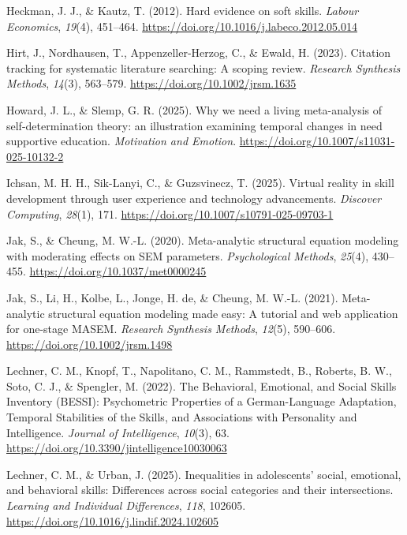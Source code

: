 \documentclass[
  man,
  longtable,
  nolmodern,
  notxfonts,
  notimes,
  colorlinks=true,linkcolor=blue,citecolor=blue,urlcolor=blue]{apa7}
\newlength{\cslhangindent}
\newenvironment{CSLReferences}[2] %
 {\begin{list}{}{%
  \setlength{\itemindent}{0pt}
  \setlength{\leftmargin}{0pt}
  \setlength{\parsep}{0pt}
  \ifodd #1
   \setlength{\leftmargin}{\cslhangindent}
   \setlength{\itemindent}{-1\cslhangindent}
  \fi
  \setlength{\itemsep}{#2\baselineskip}}}
 {\end{list}}
\begin{document}
\begin{CSLReferences}{1}{0}
Heckman, J. J., \& Kautz, T. (2012). Hard evidence on soft skills.
\emph{Labour Economics}, \emph{19}(4), 451--464.
\url{https://doi.org/10.1016/j.labeco.2012.05.014}

Hirt, J., Nordhausen, T., Appenzeller‐Herzog, C., \& Ewald, H. (2023).
Citation tracking for systematic literature searching: A scoping review.
\emph{Research Synthesis Methods}, \emph{14}(3), 563--579.
\url{https://doi.org/10.1002/jrsm.1635}

Howard, J. L., \& Slemp, G. R. (2025). Why we need a living
meta-analysis of self-determination theory: an illustration examining
temporal changes in need supportive education. \emph{Motivation and
Emotion}. \url{https://doi.org/10.1007/s11031-025-10132-2}

Ichsan, M. H. H., Sik-Lanyi, C., \& Guzsvinecz, T. (2025). Virtual
reality in skill development through user experience and technology
advancements. \emph{Discover Computing}, \emph{28}(1), 171.
\url{https://doi.org/10.1007/s10791-025-09703-1}

Jak, S., \& Cheung, M. W.-L. (2020). Meta-analytic structural equation
modeling with moderating effects on SEM parameters. \emph{Psychological
Methods}, \emph{25}(4), 430--455.
\url{https://doi.org/10.1037/met0000245}

Jak, S., Li, H., Kolbe, L., Jonge, H. de, \& Cheung, M. W.-L. (2021).
Meta-analytic structural equation modeling made easy: A tutorial and web
application for one-stage MASEM. \emph{Research Synthesis Methods},
\emph{12}(5), 590--606. \url{https://doi.org/10.1002/jrsm.1498}

Lechner, C. M., Knopf, T., Napolitano, C. M., Rammstedt, B., Roberts, B.
W., Soto, C. J., \& Spengler, M. (2022). The Behavioral, Emotional, and
Social Skills Inventory (BESSI): Psychometric Properties of a
German-Language Adaptation, Temporal Stabilities of the Skills, and
Associations with Personality and Intelligence. \emph{Journal of
Intelligence}, \emph{10}(3), 63.
\url{https://doi.org/10.3390/jintelligence10030063}

Lechner, C. M., \& Urban, J. (2025). Inequalities in adolescents'
social, emotional, and behavioral skills: Differences across social
categories and their intersections. \emph{Learning and Individual
Differences}, \emph{118}, 102605.
\url{https://doi.org/10.1016/j.lindif.2024.102605}


\end{CSLReferences}
\end{document}

